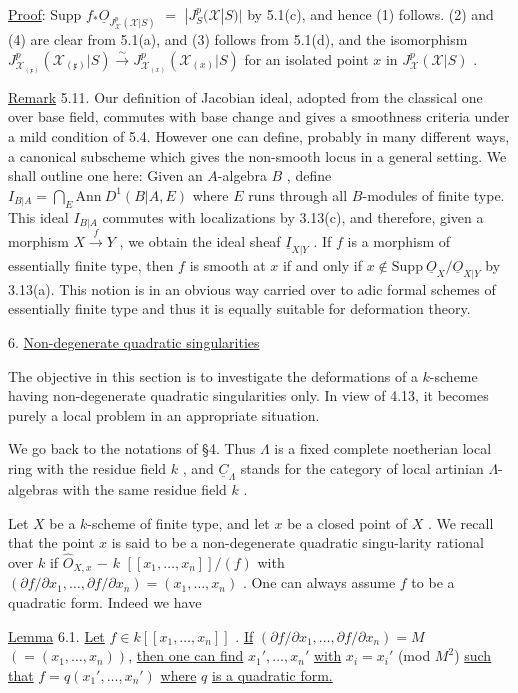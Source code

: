 \underline{Proof}:  Supp $f_*\underline{O}_{J^p_{\mathcal{X}}(\mathcal{X}|S)}$ $=$ $|J^p_S(\mathcal{X}|S)|$  by 5.1(c), and hence (1) follows. (2) and (4) are clear from 5.1(a), and (3) follows from 5.1(d), and the isomorphism $J^p_{\mathcal{X}_{(\mathfrak{x})}}(\mathcal{X}_{(\mathfrak{x})}|S) \xrightarrow{\sim} J^p_{\mathcal{X}_{(x)}}(\mathcal{X}_{(x)}|S)$  for an isolated point  $x$  in  $J^p_{\mathcal{X}}(\mathcal{X}|S)$  .

\underline{Remark} 5.11.  Our definition of Jacobian ideal, adopted from the classical one over base field, commutes with base change and gives a smoothness criteria under a mild condition of 5.4. However one can define, probably in many different ways, a canonical subscheme which gives the non-smooth locus in a general setting. We shall outline one here:  Given an $A$-algebra  $B$  , define  $I_{B|A} = \bigcap_E \mathrm{Ann}\ D^1(B|A,E)$ where  $E$  runs through all  $B$-modules of finite type. This ideal  $I_{B|A}$  commutes with localizations by 3.13(c), and therefore, given a morphism  $X \xrightarrow{\ f\ } Y$  , we obtain the ideal sheaf  $\underline{I}_{X|Y}$  . If  $f$  is a morphism of essentially finite type, then  $f$  is smooth at  $x$  if and only if  $x \notin \mathrm{Supp}\ \underline{O}_X/\underline{O}_{X|Y}$  by 3.13(a). This notion is in an obvious way carried over to adic formal schemes of essentially
finite type and thus it is equally suitable for deformation theory.


6.  \underline{Non-degenerate quadratic singularities}

The objective in this section is to investigate the deformations of a $k$-scheme having non-degenerate quadratic singularities only. In view of 4.13, it becomes purely a local problem in an appropriate situation.

We go back to the notations of  §4. Thus  $\Lambda$  is a fixed complete noetherian local ring with the residue field  $k$  , and  $\underline{C}_\Lambda$  stands for the category of local artinian $\Lambda$-algebras with the same residue field  $k$  .

Let  $X$  be a $k$-scheme of finite type, and let  $x$  be a closed point of $X$  . We recall that the point  $x$  is said to be a non-degenerate quadratic singu-larity rational over  $k$  if  $\hat{O}_{X,x}$ $-$ $k$ $[[x_1,\ldots,x_n]]/(f)$  with $(\partial f/\partial x_1,\ldots,\partial f/\partial x_n) = (x_1,\ldots,x_n)$  . One  can always assume  $f$  to be a quadratic form. Indeed we have

\underline{Lemma} 6.1.  \underline{Let}  $f \in k[[x_1,\ldots,x_n]]$  . \underline{If}  $(\partial f/\partial x_1,\ldots,\partial f/\partial x_n) = M$  $(= (x_1,\ldots,x_n))$, \underline{then one can find}  $x_1',\ldots,x_n'$  \underline{with}  $x_i = x_i'$  (mod $M^2$)  \underline{such that} $f = q(x_1',\ldots,x_n')$  \underline{where}  $q$  \underline{is a quadratic form.}

